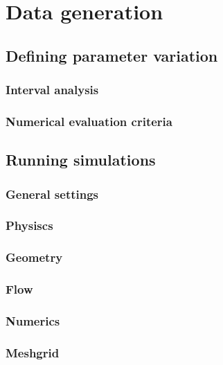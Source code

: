 \chapter{Data generation}\label{data-generation}
\section{Defining parameter
variation}\label{defining-parameter-variation}

\subsection{Interval analysis}\label{interval-analysis}

\subsection{Numerical evaluation
criteria}\label{numerical-evaluation-criteria}

\section{Running simulations}\label{running-simulations}

\subsection{General settings}\label{general-settings}

\subsection{Physiscs}\label{physiscs}

\subsection{Geometry}\label{geometry}

\subsection{Flow}\label{flow}

\subsection{Numerics}\label{numerics}

\subsection{Meshgrid}\label{meshgrid}

